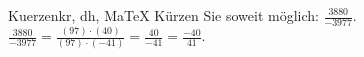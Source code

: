 \begin{MAufgabe}{Kuerzen}{kr, dh, MaTeX}
K\"urzen Sie soweit m\"oglich: $\frac{3880}{-3977}$.\\ 
\ifLsg\MLoesung
\quad $\frac{3880}{-3977}=\frac{(97)\cdot(40)}{(97)\cdot(-41)}=\frac{40}{-41}=\frac{-40}{41}$.\else\relax\fi
 \end{MAufgabe}
